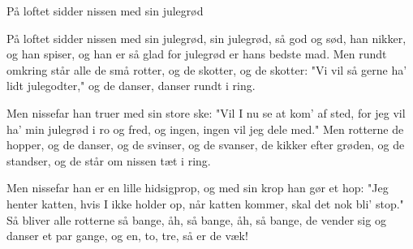 \begin{sang}{På loftet sidder nissen med sin julegrød}{}
\begin{vers}
På loftet sidder nissen med sin julegrød,
sin julegrød, så god og sød,
han nikker, og han spiser, og han er så glad
for julegrød er hans bedste mad.
Men rundt omkring står alle de små rotter,
og de skotter, og de skotter:
"Vi vil så gerne ha' lidt julegodter,"
og de danser, danser rundt i ring.
\end{vers}
\begin{vers}
Men nissefar han truer med sin store ske:
"Vil I nu se at kom' af sted,
for jeg vil ha' min julegrød i ro og fred,
og ingen, ingen vil jeg dele med."
Men rotterne de hopper, og de danser,
og de svinser, og de svanser,
de kikker efter grøden, og de standser,
og de står om nissen tæt i ring.
\end{vers}
\begin{vers}
Men nissefar han er en lille hidsigprop,
og med sin krop han gør et hop:
"Jeg henter katten, hvis I ikke holder op,
når katten kommer, skal det nok bli' stop."
Så bliver alle rotterne så bange,
åh, så bange, åh, så bange,
de vender sig og danser et par gange,
og en, to, tre, så er de væk! 
\end{vers}
\laps
\end{sang}